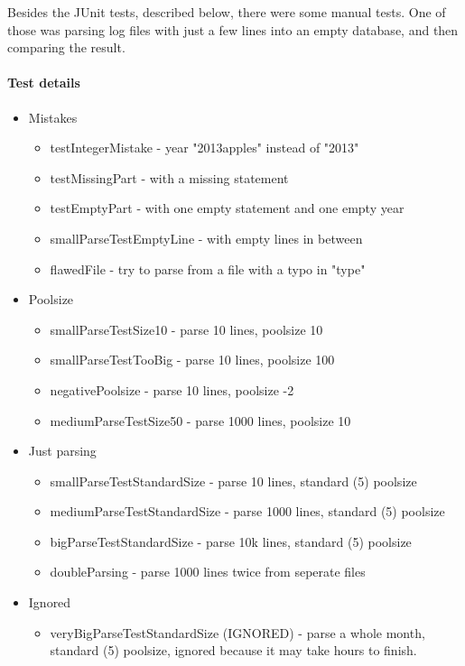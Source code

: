 Besides the JUnit tests, described below, there were some manual tests. One of those was parsing log files with
just a few lines into an empty database, and then comparing the result.

\paragraph{Test details}
\begin{itemize}

\item Mistakes 
\begin{itemize}
\item testIntegerMistake - year "2013apples" instead of "2013"
\item testMissingPart - with a missing statement
\item testEmptyPart - with one empty statement and one empty year
\item smallParseTestEmptyLine - with empty lines in between
\item flawedFile - try to parse from a file with a typo in "type" %
\end{itemize}

\item Poolsize
\begin{itemize}
\item smallParseTestSize10 - parse 10 lines, poolsize 10
\item smallParseTestTooBig - parse 10 lines, poolsize 100 %
\item negativePoolsize - parse 10 lines, poolsize -2 %
\item mediumParseTestSize50 - parse 1000 lines, poolsize 10
\end{itemize}

\item Just parsing
\begin{itemize}
\item smallParseTestStandardSize - parse 10 lines, standard (5) poolsize
\item mediumParseTestStandardSize - parse 1000 lines, standard (5) poolsize
\item bigParseTestStandardSize - parse 10k lines, standard (5) poolsize
\item doubleParsing - parse 1000 lines twice from seperate files
\end{itemize}

\item Ignored
\begin{itemize}
\item veryBigParseTestStandardSize (IGNORED) - parse a whole month, standard (5) poolsize, ignored because it may take hours 
to finish.
\end{itemize}

\end{itemize}
